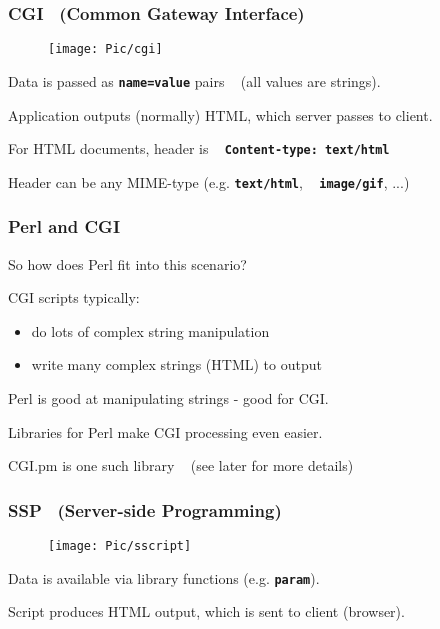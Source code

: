 \begin{frame}
\frametitle{CGI ~{\small (Common Gateway Interface)}}

    \begin{figure}
        \centering
        \texttt{[image: Pic/cgi]}
    \end{figure}

Data is passed as \textbf{\tt{name=value}} pairs
    ~ {\small (all values are strings)}.

Application outputs (normally) HTML, which server passes to client.

For HTML documents, header is ~ \textbf{\tt{Content-type: text/html}}

{\small 
Header can be any MIME-type (e.g. \textbf{\tt{text/html}}, ~ \textbf{\tt{image/gif}}, ...)
}
\end{frame}

\begin{frame}
\frametitle{Perl and CGI}
So how does Perl fit into this scenario?

CGI scripts typically:
\begin{itemize}
\item  do lots of complex string manipulation
\item  write many complex strings (HTML) to output
\end{itemize}
Perl is good at manipulating strings - good for CGI.

Libraries for Perl make CGI processing even easier.

CGI.pm is one such library 
    ~ {\small (see later for more details)}
\end{frame}

\begin{frame}
\frametitle{SSP ~{\small (Server-side Programming)}}


    \begin{figure}
        \centering
        \texttt{[image: Pic/sscript]}
    \end{figure}

Data is available via library functions (e.g. \textbf{\tt{param}}).

Script produces HTML output, which is sent to client (browser).

\end{frame}

